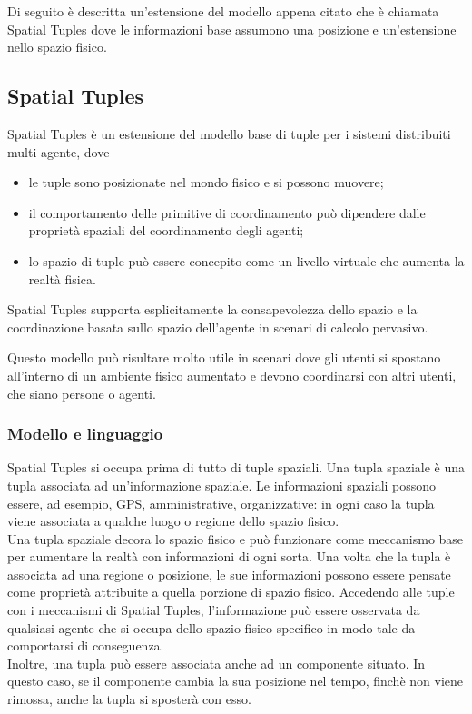 Di seguito è descritta un'estensione del modello appena citato che è chiamata Spatial Tuples dove le informazioni base assumono una posizione e un'estensione nello spazio fisico.

\subsection{Spatial Tuples}
Spatial Tuples è un estensione del modello base di tuple per i sistemi distribuiti multi-agente, dove
\begin{itemize}
\item le tuple sono posizionate nel mondo fisico e si possono muovere;
\item il comportamento delle primitive di coordinamento può dipendere dalle proprietà spaziali del coordinamento degli agenti;
\item lo spazio di tuple può essere concepito come un livello virtuale che aumenta la realtà fisica.
\end{itemize}
Spatial Tuples supporta esplicitamente la consapevolezza dello spazio e la coordinazione basata sullo spazio dell'agente in scenari di calcolo pervasivo.

Questo modello può risultare molto utile in scenari dove gli utenti si spostano all'interno di un ambiente fisico aumentato e devono coordinarsi con altri utenti, che siano persone o agenti.

\subsubsection{Modello e linguaggio}
Spatial Tuples si occupa prima di tutto di tuple spaziali. Una tupla spaziale è una tupla associata ad un'informazione spaziale. Le informazioni spaziali possono essere, ad esempio, GPS, amministrative, organizzative: in ogni caso la tupla viene associata a qualche luogo o regione dello spazio fisico.
\\
Una tupla spaziale decora lo spazio fisico e può funzionare come meccanismo base per aumentare la realtà con informazioni di ogni sorta. Una volta che la tupla è associata ad una regione o posizione, le sue informazioni possono essere pensate come proprietà attribuite a quella porzione di spazio fisico. Accedendo alle tuple con i meccanismi di Spatial Tuples, l'informazione può essere osservata da qualsiasi agente che si occupa dello spazio fisico specifico in modo tale da comportarsi di conseguenza.
\\
Inoltre, una tupla può essere associata anche ad un componente situato. In questo caso, se il componente cambia la sua posizione nel tempo, finchè non viene rimossa, anche la tupla si sposterà con esso.


